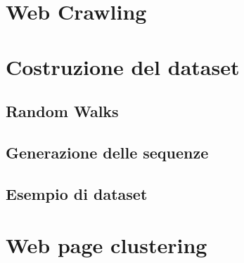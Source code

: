 \documentclass[a4paper,12pt,oneside]{book}
\begin{document}
\section{Web Crawling}

\section{Costruzione del dataset}

\subsection{Random Walks}

\subsection{Generazione delle sequenze}

\subsection{Esempio di dataset}

\section{Web page clustering}


\end{document}

